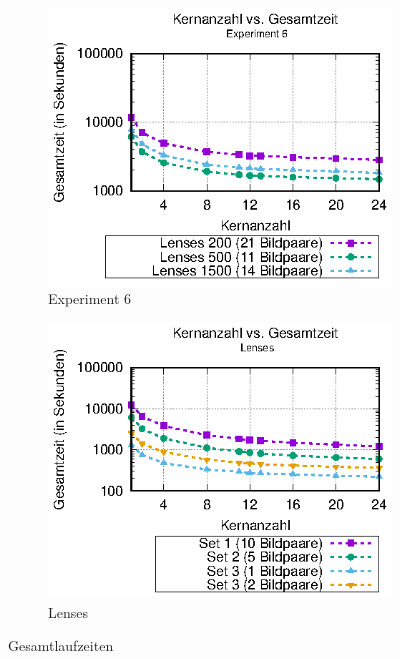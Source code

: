 \begin{center}
	\begin{figure}
		\begin{subfigure}[b]{0.49\textwidth}
			\centering
			\includegraphics[width=\textwidth]{pdf/times_exp6}
			\caption[Experiment 6]{Experiment 6}
			\label{fig:times_exp6}
		\end{subfigure}
		\hfill
		\begin{subfigure}[b]{0.49\textwidth}
			\centering
			\includegraphics[width=\textwidth]{pdf/times_lenses}
			\caption[Lenses]{Lenses}
			\label{fig:times_lenses}
		\end{subfigure}
		\caption{Gesamtlaufzeiten}
		\label{fig:gesamtlaufzeiten}
	\end{figure}
\end{center}

